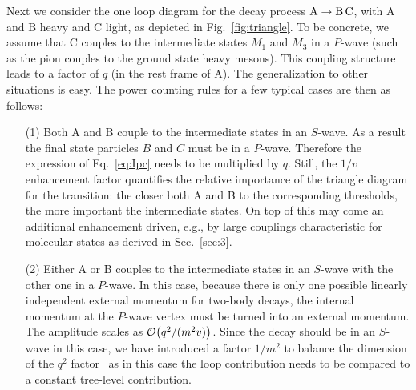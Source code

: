 Next we consider the one loop diagram for the decay process $\text{A}\to 
\text{B\,C}$, with A and B heavy and C  light, as depicted in 
Fig.~\ref{fig:triangle}. To be concrete, 
we assume that C couples to the intermediate states $M_1$ and $M_3$ in a
$P$-wave (such as the pion couples to the ground state heavy mesons).
This coupling structure leads to  a 
factor of  $q$ (in the rest frame of A). The generalization to 
other situations is easy. The power counting rules for a few typical cases are 
then
as follows:
\begin{itemize}
  \item[(1)] Both A and B couple to the intermediate states in an $S$-wave.
  As a result the final state particles $B$ and $C$ must be in a $P$-wave. 
Therefore the expression of  Eq.~\eqref{eq:Ipc} needs to be multiplied by $q$. 
Still, the $1/v$ enhancement factor quantifies the relative importance of the 
triangle diagram for the transition: the closer both A and B to the 
corresponding thresholds, the more important the intermediate states. On top of 
this may come an additional enhancement
driven, e.g., by large couplings characteristic for molecular states as derived 
in Sec.~\ref{sec:3}.

  \item[(2)] Either A or B couples to the  intermediate states in an 
$S$-wave with the other one in a $P$-wave. In this case, because there is 
only one 
possible linearly independent external momentum for two-body decays, the 
internal momentum at the $P$-wave vertex must be turned into an external 
momentum. The amplitude scales as $\mathcal{O}\!\left(q^2/(m^2v)\right)\!\,$. Since the decay 
should be in an $S$-wave in this case, we have introduced a factor $1/m^2$ to 
balance the dimension of the $q^2$ factor~\cite{Guo:2010ak} as in this case
the loop contribution needs to be compared to a constant tree-level 
contribution.
 

\end{itemize}
